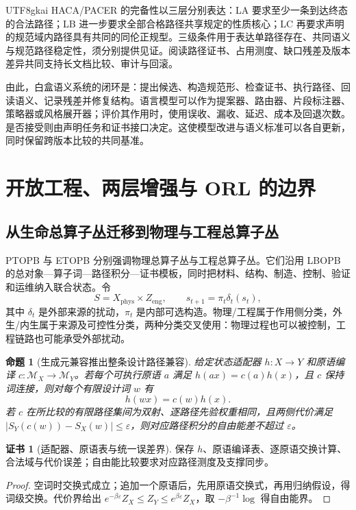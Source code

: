 \documentclass[11pt,a4paper]{article}
\theoremstyle{plain}
\newtheorem{proposition}[theorem]{命题}
\theoremstyle{definition}
\newtheorem*{certificate}{证书}
\theoremstyle{remark}
\begin{document}
\begin{CJK*}{UTF8}{gkai}
HACA/PACER 的完备性以三层分别表达：LA 要求至少一条到达终态的合法路径；LB 进一步要求全部合格路径共享规定的性质核心；LC 再要求声明的规范域内路径具有共同的同伦正规型。三级条件用于表达单路径存在、共同语义与规范路径稳定性，须分别提供见证。阅读路径证书、占用测度、缺口残差及版本差异共同支持长文档比较、审计与回滚。\cite{S04}

由此，白盒语义系统的闭环是：提出候选、构造规范形、检查证书、执行路径、回读语义、记录残差并修复结构。语言模型可以作为提案器、路由器、片段标注器、策略器或风格展开器；评价其作用时，使用误收、漏收、延迟、成本及回退次数。是否接受则由声明任务和证书接口决定。这使模型改进与语义标准可以各自更新，同时保留跨版本比较的共同基准。

\section{开放工程、两层增强与 ORL 的边界}
\label{fa:openengineering}

\subsection{从生命总算子丛迁移到物理与工程总算子丛}

PTOPB 与 ETOPB 分别强调物理总算子丛与工程总算子丛。它们沿用 LBOPB 的总对象—算子词—路径积分—证书模板，同时把材料、结构、制造、控制、验证和运维纳入联合状态。令
\[
 S=X_{\mathrm{phys}}\times Z_{\mathrm{eng}},\qquad
 s_{t+1}=\pi_t\delta_t(s_t),
\]
其中 $\delta_t$ 是外部来源的扰动，$\pi_t$ 是内部可选构造。物理/工程属于作用侧分类，外生/内生属于来源及可控性分类，两种分类交叉使用：物理过程也可以被控制，工程链路也可能承受外部扰动。\cite{S13,S14,S15}

\begin{proposition}[生成元兼容推出整条设计路径兼容]
\label{fa:prop-compile}
给定状态适配器 $h:X\to Y$ 和原语编译 $c:\mathcal M_X\to\mathcal M_Y$。若每个可执行原语 $a$ 满足 $h(a x)=c(a)h(x)$，且 $c$ 保持词连接，则对每个有限设计词 $w$ 有
\[
 h(w x)=c(w)h(x).
\]
若 $c$ 在所比较的有限路径集间为双射、逐路径先验权重相同，且两侧代价满足 $|S_Y(c(w))-S_X(w)|\le\varepsilon$，则对应路径积分的自由能差不超过 $\varepsilon$。
\end{proposition}
\begin{certificate}[适配器、原语表与统一误差界]
保存 $h$、原语编译表、逐原语交换计算、合法域与代价误差；自由能比较要求对应路径测度及支撑同步。
\end{certificate}
\begin{proof}
空词时交换式成立；追加一个原语后，先用原语交换式，再用归纳假设，得词级交换。代价界给出
$e^{-\beta\varepsilon}Z_X\le Z_Y\le e^{\beta\varepsilon}Z_X$，取 $-\beta^{-1}\log$ 得自由能界。
\end{proof}


\end{CJK*}
\end{document}

